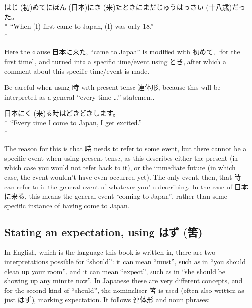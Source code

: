 \documentclass[11pt, b5paper, twoside, openright, onecolumn]{book}
\makeatletter
\newcommand*{\rubystack}[2]{{\relscale{0.5}%
  \begin{tabular}[b]{@{}c@{}}%
    {#1}\\%
   {\textscale{2}{#2}}%
  \end{tabular}}%
}
\DeclareRobustCommand*{\ruby}[2]{%
  \mbox{%
    \setlength{\parskip}{0ex}%
    \BeginAccSupp{method=pdfstringdef,ActualText={#1}}%
      \rubystack{\phantom{#2}}{#1}%
      \llap{%
        \rubystack{#2}{\phantom{#1}}%
      }%
    \EndAccSupp{}%
  }%
}
\renewcommand*{\ruby}[2]{#2 (#1)}%
\newenvironment{exampleblock}{
\setlength{\parindent}{0.6in}
\begin{minipage}[t]{\dimexpr\textwidth-\parindent}}
{\end{minipage}}
\makeatother
\begin{document}
\vspace{0.4cm}
\begin{exampleblock}
\ruby{初}{はじ}めて\ruby{日本}{にほん}に\ruby{来}{き}たときにまだ\ruby{十八歳}{じゅうはっさい}だった。 \\* 
“When (I) first came to Japan‚ (I) was only 18.” \\* 
\end{exampleblock}
\vspace{0.2cm}

Here the clause 日本に来た‚ “came to Japan” is modified with 初めて‚ “for the first time”‚ and turned into a specific time/event using とき‚ after which a comment about this specific time/event is made.

Be careful when using 時 with present tense 連体形‚ because this will be interpreted as a general “every time …” statement.

\vspace{0.4cm}
\begin{exampleblock}
日本に\ruby{来}{く}る時はどきどきします。 \\* 
“Every time I come to Japan‚ I get excited.” \\* 
\end{exampleblock}
\vspace{0.2cm}

The reason for this is that 時 needs to refer to some event‚ but there cannot be a specific event when using present tense‚ as this describes either the present (in which case you would not refer back to it)‚ or the immediate future (in which case‚ the event wouldn’t have even occurred yet). The only event‚ then‚ that 時 can refer to is the general event of whatever you’re describing. In the case of 日本に来る‚ this means the general event “coming to Japan”‚ rather than some specific instance of having come to Japan.

\subsection{Stating an expectation‚ using \ruby{筈}{はず}}

In English‚ which is the language this book is written in‚ there are two interpretations possible for “should”: it can mean “must”‚ such as in “you should clean up your room”‚ and it can mean “expect”‚ such as in “she should be showing up any minute now”. In Japanese these are very different concepts‚ and for the second kind of “should”‚ the nominaliser 筈 is used (often also written as just はず)‚ marking expectation. It follows 連体形 and noun phrases:
\end{document}
